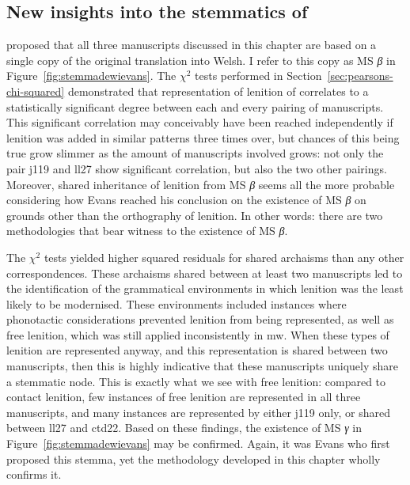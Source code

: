 \subsection{New insights into the stemmatics of }
\label{sec:new-insights-into}

\Textcite[lviii]{Eva_Welsh88} proposed that all three manuscripts discussed in this chapter are based on a single copy of the original translation into Welsh. I refer to this copy as MS \textit{β} in Figure~\ref{fig:stemmadewievans}. The \(\chi^2\) tests performed in Section~\ref{sec:pearsons-chi-squared} demonstrated that representation of lenition of  correlates to a statistically significant degree between each and every pairing of manuscripts. This significant correlation may conceivably have been reached independently if lenition was added in similar patterns three times over, but chances of this being true grow slimmer as the amount of manuscripts involved grows: not only the pair \gls{j119} and \gls{ll27} show significant correlation, but also the two other pairings. Moreover, shared inheritance of lenition from MS \textit{β} seems all the more probable considering how Evans reached his conclusion on the existence of MS \textit{β} on grounds other than the orthography of lenition. In other words: there are two methodologies that bear witness to the existence of MS \textit{β}. 

The \(\chi^2\) tests yielded higher squared residuals for shared archaisms than any other correspondences. These archaisms shared between at least two manuscripts led to the identification of the grammatical environments in which lenition was the least likely to be modernised. These environments included instances where phonotactic considerations prevented lenition from being represented, as well as free lenition, which was still applied inconsistently in \gls{mw}. When these types of lenition are represented anyway, and this representation is shared between two manuscripts, then this is highly indicative that these manuscripts uniquely share a stemmatic node. This is exactly what we see with free lenition: compared to contact lenition, few instances of free lenition are represented in all three manuscripts, and many instances are represented by either \gls{j119} only, or shared between \gls{ll27} and \gls{ctd22}. Based on these findings, the existence of MS \textit{γ} in Figure~\ref{fig:stemmadewievans} may be confirmed. Again, it was Evans who first proposed this stemma, yet the methodology developed in this chapter wholly confirms it.

